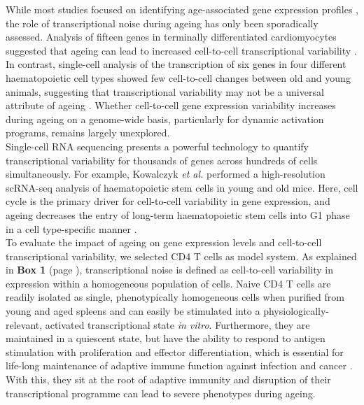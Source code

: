 While most studies focused on identifying age-associated gene expression profiles \citep{DeMagalhaes2009}, the role of transcriptional noise during ageing has only been sporadically assessed. 
Analysis of fifteen genes in terminally differentiated cardiomyocytes suggested that ageing can lead to increased cell-to-cell transcriptional variability \citep{Bahar2006}. 
In contrast, single-cell analysis of the transcription of six genes in four different haematopoietic cell types showed few cell-to-cell changes between old and young animals, suggesting that transcriptional variability may not be a universal attribute of ageing \citep{Warren2007}. 
Whether cell-to-cell gene expression variability increases during ageing on a genome-wide basis, particularly for dynamic activation programs, remains largely unexplored.\\

Single-cell RNA sequencing presents a powerful technology to quantify  transcriptional variability for thousands of genes across hundreds of cells simultaneously. 
For example, Kowalczyk \textit{et al.} performed a high-resolution scRNA-seq analysis of haematopoietic stem cells in young and old mice. 
Here, cell cycle is the primary driver for cell-to-cell variability in gene expression, and ageing decreases the entry of long-term haematopoietic stem cells into G1 phase in a cell type-specific manner \citep{Kowalczyk2015}.\\ 

To evaluate the impact of ageing on gene expression levels and cell-to-cell transcriptional variability, we selected CD4\plus{} T cells as model system. 
As explained in \textbf{Box 1} (page \pageref{box1}), transcriptional noise is defined as cell-to-cell variability in expression within a homogeneous population of cells. 
Naive CD4\plus{} T cells are readily isolated as single, phenotypically homogeneous cells when purified from young and aged spleens and can easily be stimulated into a physiologically-relevant, activated transcriptional state \emph{in vitro}. 
Furthermore, they are maintained in a quiescent state, but have the ability to respond to antigen stimulation with proliferation and effector differentiation, which is essential for life-long maintenance of adaptive immune function against infection and cancer \citep{Swain2012, Kim2014a}. 
With this, they sit at the root of adaptive immunity and disruption of their transcriptional programme can lead to severe phenotypes during ageing. \\

